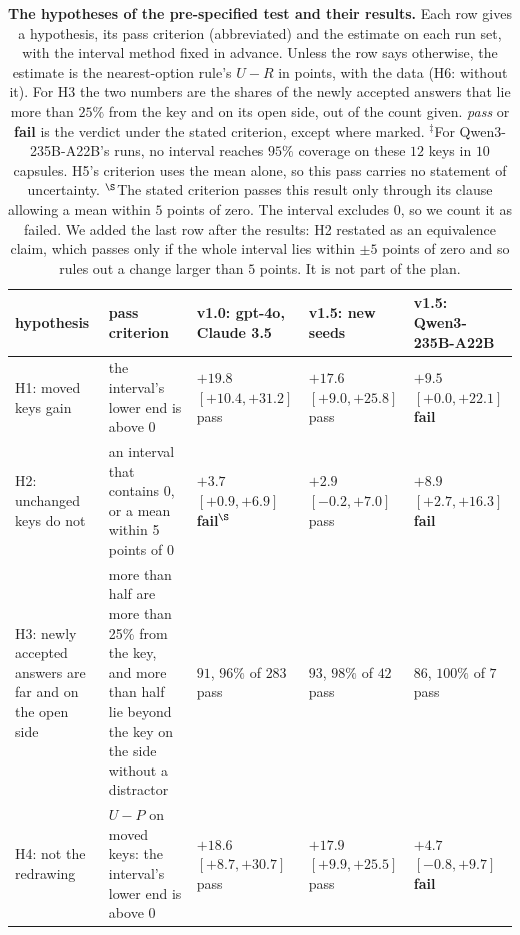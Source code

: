 \documentclass{article}
\begin{document}
\begin{table}[htbp]
\centering\scriptsize\setlength{\tabcolsep}{2.5pt}
\caption{\textbf{The hypotheses of the pre-specified test and their results.} Each row gives a hypothesis, its
pass criterion (abbreviated) and the estimate on each run set, with the interval method fixed in advance. Unless the
row says otherwise, the estimate is the nearest-option rule's $U-R$ in points, with the data (H6: without it). For H3
the two numbers are the shares of the newly accepted answers that lie more than $25\%$ from the key and on its open
side, out of the count given. \emph{pass} or \textbf{fail} is the verdict under the stated criterion, except where
marked. $^{\ddagger}$For Qwen3-235B-A22B's runs, no interval reaches $95\%$ coverage on these $12$ keys in $10$
capsules. H5's criterion uses the
mean alone, so this pass carries no statement of uncertainty. $^{\S}$The stated criterion passes this result only
through its clause allowing a mean within $5$ points of zero. The interval excludes $0$, so we count it as failed. We
added the last row after the results: H2 restated as an equivalence claim, which passes only if the whole interval
lies within $\pm5$ points of zero and so rules out a change larger than $5$ points. It is not part of the plan.}
\label{tab:predictions}
\begin{tabularx}{\linewidth}{@{}p{2.2cm}Xp{2.35cm}p{2.35cm}p{2.35cm}@{}}
\toprule
hypothesis & pass criterion & v1.0: gpt-4o, Claude 3.5 & v1.5: new seeds & v1.5: Qwen3-235B-A22B\\
\midrule
H1: moved keys gain & the interval's lower end is above 0 & $+19.8$ {\scriptsize$[+10.4,+31.2]$} pass & $+17.6$ {\scriptsize$[+9.0,+25.8]$} pass & $+9.5$ {\scriptsize$[+0.0,+22.1]$} \textbf{fail}\\
H2: unchanged keys do not & an interval that contains 0, or a mean within 5 points of 0 & $+3.7$ {\scriptsize$[+0.9,+6.9]$} \textbf{fail}$^{\S}$ & $+2.9$ {\scriptsize$[-0.2,+7.0]$} pass & $+8.9$ {\scriptsize$[+2.7,+16.3]$} \textbf{fail}\\
H3: newly accepted answers are far and on the open side & more than half are more than 25\% from the key, and more than half lie beyond the key on the side without a distractor & $91$, $96\%$ of $283$ pass & $93$, $98\%$ of $42$ pass & $86$, $100\%$ of $7$ pass\\
H4: not the redrawing & $U-P$ on moved keys: the interval's lower end is above 0 & $+18.6$ {\scriptsize$[+8.7,+30.7]$} pass & $+17.9$ {\scriptsize$[+9.9,+25.5]$} pass & $+4.7$ {\scriptsize$[-0.8,+9.7]$} \textbf{fail}\\

\end{tabularx}
\end{table}
\end{document}
